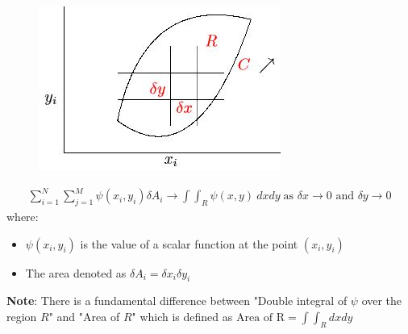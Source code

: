 \documentclass[10pt,a4paper]{article}
\begin{document}
\begin{figure} [h!]
    \centering
    \includegraphics[scale=0.65]{Doubleint.JPG}
\end{figure}
\begin{align*}
    \sum_{i=1}^N \sum_{j=1}^M \psi(x_i,y_i) \delta A_i \rightarrow \int \int_R \psi(x,y) \: dxdy \; \text{as } \delta x \rightarrow 0 \text{ and } \delta y \rightarrow 0
\end{align*}
where:
\begin{itemize}
    \item $\psi(x_i,y_i)$ is the value of a scalar function at the point $(x_i,y_i)$
    \item The area denoted as $\delta A_i = \delta x_i \delta y_i$
\end{itemize}

\pagebreak
\textbf{Note}: There is a fundamental difference between "Double integral of $\psi$ over the region
$R$" and "Area of $R$" which is defined as $\text{Area of R} = \int \int_R dxdy$
\end{document}

